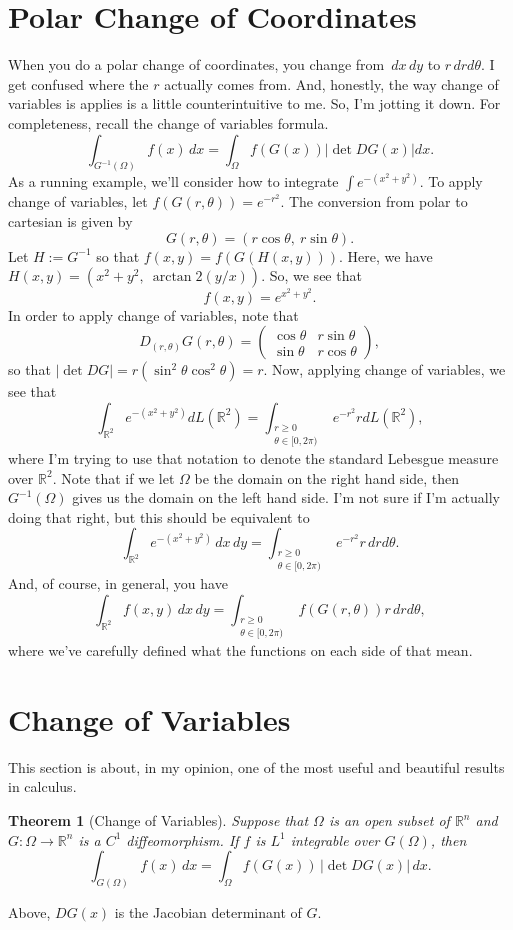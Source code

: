\documentclass{book}
\newtheorem{theorem}{Theorem}
\newcommand{\dx}{\, dx}
\newcommand{\dy}{\, dy}
\newcommand{\dr}{\, dr}
\newcommand{\R}{\mathbb{R}}
\begin{document}
\section{Polar Change of Coordinates}
When you do a polar change of coordinates, you change from $\dx \dy$ to $r\dr d\theta$. I get confused where the $r$ actually comes from. And, honestly, the way change of variables is applies is a little counterintuitive to me. So, I'm jotting it down. 
For completeness, recall the change of variables formula. 
$$
\int_{G^{-1}(\Omega)} f(x)\dx = \int_\Omega f(G(x))|\det DG(x)|dx.
$$
As a running example, we'll consider how to integrate $\int e^{-(x^2 + y^2)}$. To apply change of variables, let $f(G(r,\theta)) = e^{-r^2}$. The conversion from polar to cartesian is given by 
$$
G(r, \theta) = (r\cos \theta, ~r\sin \theta). 
$$
Let $H:= G^{-1}$ so that $f(x,y) = f(G(H(x, y)))$. Here, we have $H(x,y) = (x^2 + y^2, ~ \arctan{2}(y/x))$. So, we see that 
$$
f(x,y) = e^{x^2 + y^2}.
$$
In order to apply change of variables, note that 
$$
D_{(r,\theta)} G(r,\theta) = 
\begin{pmatrix}
\cos\theta & r\sin\theta\\
\sin\theta & r\cos\theta
\end{pmatrix},
$$
so that $|\det D G| = r(\sin^2\theta \cos^2\theta) = r$. Now, applying change of variables, we see that
$$
\int_{\R^2} e^{-(x^2 + y^2)} dL(\R^2) = \int_{\substack{r \geq 0\\ \theta \in [0, 2\pi)}} e^{-r^2} r dL(\R^2),
$$
where I'm trying to use that notation to denote the standard Lebesgue measure over $\R^2$. Note that if we let $\Omega$ be the domain on the right hand side, then $G^{-1}(\Omega)$ gives us the domain on the left hand side. I'm not sure if I'm actually doing that right, but this should be equivalent to
$$
\int_{\R^2} e^{-(x^2 + y^2)} \dx \dy = \int_{\substack{r \geq 0\\ \theta \in [0, 2\pi)}} e^{-r^2} r \dr d\theta.
$$
And, of course, in general, you have
$$
\int_{\R^2} f(x,y) \dx \dy = \int_{\substack{r \geq 0\\ \theta \in [0, 2\pi)}} f(G(r,\theta)) r \dr d\theta,
$$
where we've carefully defined what the functions on each side of that mean. 

\section{Change of Variables}
This section is about, in my opinion, one of the most useful and beautiful results in calculus. 
\begin{theorem}[Change of Variables] \label{thrm:CoV}
Suppose that $\Omega$ is an open subset of $\R^{n}$ and $G:\Omega\to \R^n$ is a $C^1$ diffeomorphism. If $f$ is $L^1$ integrable over $G(\Omega)$, then 
\begin{equation} \label{eq:CoV}
\int_{G(\Omega)} f(x) \dx = \int_{\Omega} f(G(x)) \,\left| \det DG(x) \right| \dx.
\end{equation}
\end{theorem}
Above, $DG(x)$ is the Jacobian determinant of $G$. 
\end{document}
